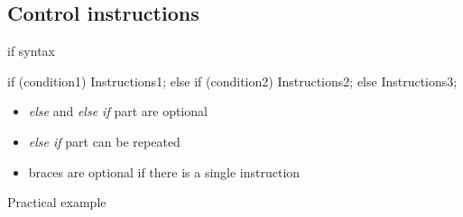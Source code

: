 \subsection[Control]{Control instructions}

\begin{frame}[fragile]
  \begin{block}{if syntax}
    \begin{cppcode*}{}
      if (condition1) {
        Instructions1;
      } else if (condition2) {
        Instructions2;
      } else {
        Instructions3;
      } 
    \end{cppcode*}
    \begin{itemize}
      \item {\it else} and {\it else if} part are optional
      \item {\it else if} part can be repeated
      \item braces are optional if there is a single instruction
    \end{itemize}
  \end{block}
\end{frame}

\begin{frame}[fragile]
  \begin{exampleblock}{Practical example}
  \end{exampleblock}
\end{frame}

